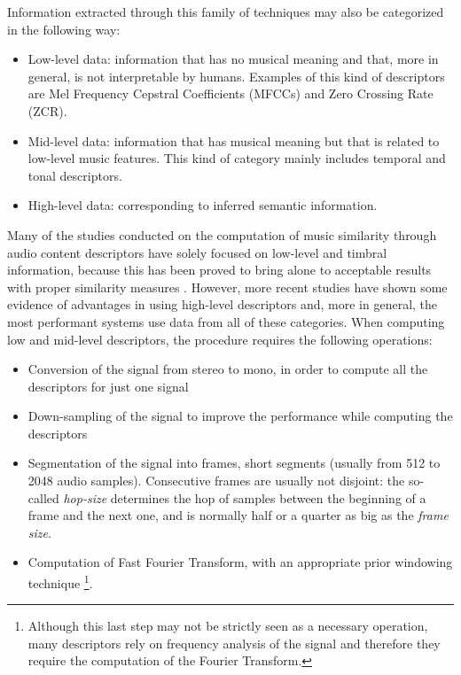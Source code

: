 Information extracted through this family of techniques may also be categorized in the following way:
\begin{itemize}
\item Low-level data: information that has no musical meaning and that, more in general, is not interpretable by humans. Examples of this kind of descriptors are Mel Frequency Cepstral Coefficients (MFCCs) and Zero Crossing Rate (ZCR).
\item Mid-level data: information that has musical meaning but that is related to low-level music features. This kind of category mainly includes temporal and tonal descriptors. 
\item High-level data: corresponding to inferred semantic information.
\end{itemize}

Many of the studies conducted on the computation of music similarity through audio content descriptors have solely focused on low-level and timbral information, because this has been proved to bring alone to acceptable results with proper similarity measures \cite{mirage07}. However, more recent studies have shown some evidence of advantages in using high-level descriptors \cite{barrington07} \cite{west07} and, more in general, the most performant systems use data from all of these categories. When computing low and mid-level descriptors, the procedure requires the following operations:
\begin{itemize}
\item Conversion of the signal from stereo to mono, in order to compute all the descriptors for just one signal
\item Down-sampling of the signal to improve the performance while computing the descriptors
\item Segmentation of the signal into frames, short segments (usually from 512 to 2048 audio samples). Consecutive frames are usually not disjoint: the so-called \textit{hop-size} determines the hop of samples between the beginning of a frame and the next one, and is normally half or a quarter as big as the \textit{frame size}.
\item Computation of Fast Fourier Transform, with an appropriate prior windowing technique \footnote{Although this last step may not be strictly seen as a necessary operation, many descriptors rely on frequency analysis of the signal and therefore they require the computation of the Fourier Transform.}.
\end{itemize}

